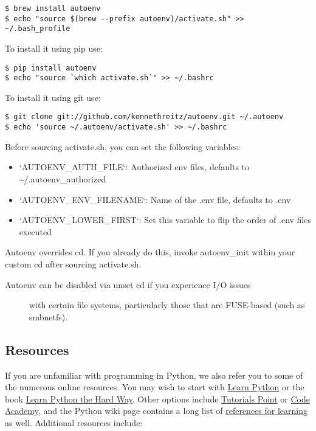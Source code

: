\begin{verbatim}
$ brew install autoenv
$ echo "source $(brew --prefix autoenv)/activate.sh" >> ~/.bash_profile
\end{verbatim}

To install it using pip use:

\begin{verbatim}
$ pip install autoenv
$ echo "source `which activate.sh`" >> ~/.bashrc
\end{verbatim}

To install it using git use:

\begin{verbatim}
$ git clone git://github.com/kennethreitz/autoenv.git ~/.autoenv
$ echo 'source ~/.autoenv/activate.sh' >> ~/.bashrc
\end{verbatim}

Before sourcing activate.sh, you can set the following variables:

\begin{itemize}

\item
  `AUTOENV\_AUTH\_FILE`: Authorized env files, defaults to
  \textasciitilde{}/.autoenv\_authorized
\item
  `AUTOENV\_ENV\_FILENAME`: Name of the .env file, defaults to .env
\item
  `AUTOENV\_LOWER\_FIRST`: Set this variable to flip the order of .env
  files executed
\end{itemize}

Autoenv overrides cd. If you already do this, invoke autoenv\_init
within your custom cd after sourcing activate.sh.

\begin{description}
\item[Autoenv can be disabled via unset cd if you experience I/O issues]
with certain file systems, particularly those that are FUSE-based (such
as smbnetfs).
\end{description}

\subsection{Resources}\label{resources}

If you are unfamiliar with programming in Python, we also refer you to
some of the numerous online resources. You may wish to start with
\href{https://www.learnpython.org}{Learn Python} or the book
\href{http://learnpythonthehardway.org/book/}{Learn Python the Hard
Way}. Other options include
\href{http://www.tutorialspoint.com/python/}{Tutorials Point} or
\href{http://www.codecademy.com/en/tracks/python}{Code Academy}, and the
Python wiki page contains a long list of
\href{https://wiki.python.org/moin/BeginnersGuide/Programmers}{references
for learning} as well. Additional resources include:

